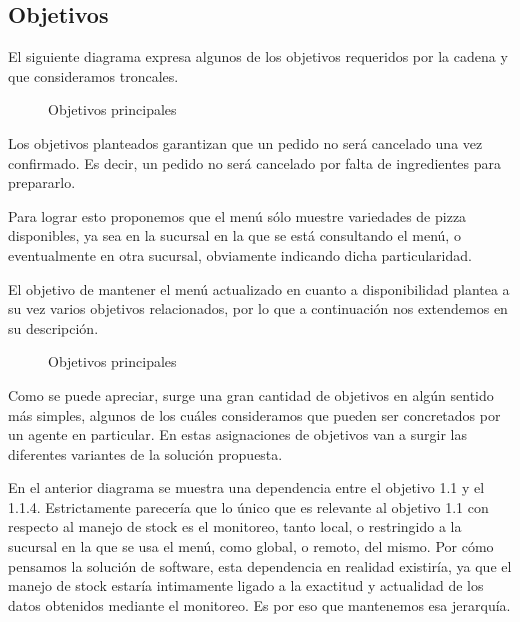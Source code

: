 \documentclass[a4paper,10pt]{article}
\begin{document}
\subsection*{Objetivos}
\noindent

El siguiente diagrama expresa algunos de los objetivos requeridos por la cadena y que consideramos troncales.

\begin{figure}[H]
\centering
{}
\caption{Objetivos principales}
\end{figure}

Los objetivos planteados garantizan que un pedido no será cancelado una vez confirmado. Es decir, un pedido no será cancelado por falta de ingredientes para prepararlo. 

Para lograr esto proponemos que el menú sólo muestre variedades de pizza disponibles, ya sea en la sucursal en la que se está consultando el menú, o eventualmente en otra sucursal, obviamente indicando dicha particularidad.

El objetivo de mantener el menú actualizado en cuanto a disponibilidad plantea a su vez varios objetivos relacionados, por lo que a continuación nos extendemos en su descripción.

\begin{figure}[H]
\centering
{}
\caption{Objetivos principales}
\end{figure}

Como se puede apreciar, surge una gran cantidad de objetivos en algún sentido más simples, algunos de los cuáles consideramos que pueden ser concretados por un agente en particular. En estas asignaciones de objetivos van a surgir las diferentes variantes de la solución propuesta. 

En el anterior diagrama se muestra una dependencia entre el objetivo 1.1 y el 1.1.4. Estrictamente parecería que lo único que es relevante al objetivo 1.1 con respecto al manejo de stock es el monitoreo, tanto local, o restringido a la sucursal en la que se usa el menú, como global, o remoto, del mismo. Por cómo pensamos la solución de software, esta dependencia en realidad existiría, ya que el manejo de stock estaría intimamente ligado a la exactitud y actualidad de los datos obtenidos mediante el monitoreo. Es por eso que mantenemos esa jerarquía.
\end{document}
